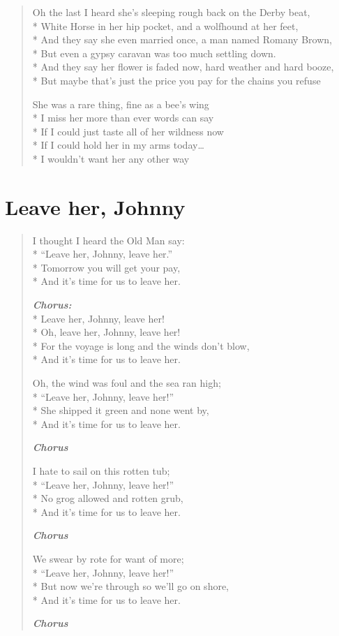 \documentclass[9pt,twoside]{extarticle}
\newenvironment{xverse}{
	\begin{verse}
	\fontsize{8.5}{10.5}\selectfont
	}
	{
	\end{verse}
	\penalty 0
}
\newcommand{\chorusdef}{\textbf{\emph{Chorus:}}\\*}
\newcommand{\chorusmark}[1][1]{%
\vspace{-0.5\stanzaskip}%
\textbf{\emph{Chorus \ifthenelse{\equal{#1}{1}}{}{$\times$ #1}}}%
\vspace{-0.5\stanzaskip}%
}
\begin{document}
\begin{xverse}
Oh the last I heard she’s sleeping rough back on the Derby beat, \\*
White Horse in her hip pocket, and a wolfhound at her feet, \\*
And they say she even married once, a man named Romany Brown, \\*
But even a gypsy caravan was too much settling down. \\*
And they say her flower is faded now, hard weather and hard booze, \\*
But maybe that’s just the price you pay for the chains you refuse

She was a rare thing, fine as a bee’s wing \\*
I miss her more than ever words can say \\*
If I could just taste all of her wildness now \\*
If I could hold her in my arms today… \\*
I wouldn’t want her any other way
\end{xverse}

\section{Leave her, Johnny}

\begin{xverse}
I thought I heard the Old Man say: \\*
“Leave her, Johnny, leave her.” \\*
Tomorrow you will get your pay, \\*
And it’s time for us to leave her.

\chorusdef
Leave her, Johnny, leave her! \\*
Oh, leave her, Johnny, leave her! \\*
For the voyage is long and the winds don’t blow, \\*
And it’s time for us to leave her.

Oh, the wind was foul and the sea ran high; \\*
“Leave her, Johnny, leave her!” \\*
She shipped it green and none went by, \\*
And it’s time for us to leave her.

\chorusmark

I hate to sail on this rotten tub; \\*
“Leave her, Johnny, leave her!” \\*
No grog allowed and rotten grub, \\*
And it’s time for us to leave her.

\chorusmark

We swear by rote for want of more; \\*
“Leave her, Johnny, leave her!” \\*
But now we’re through so we’ll go on shore, \\*
And it’s time for us to leave her.

\chorusmark
\end{xverse}
\end{document}
